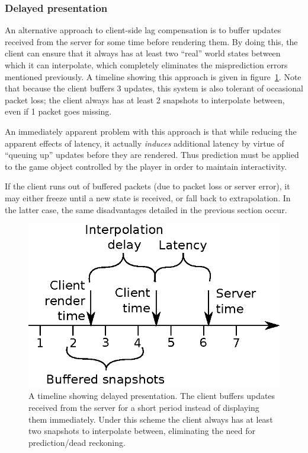 \documentclass[conference]{IEEEtran}
\begin{document}
	\subsubsection{Delayed presentation}

	An alternative approach to client-side lag compensation is to buffer updates received from the server for some time before rendering them. By doing this, the client can ensure that it always has at least two ``real'' world states between which it can interpolate, which completely eliminates the misprediction errors mentioned previously. A timeline showing this approach is given in figure~\ref{fig:interpolation_timeline}. Note that because the client buffers 3 updates, this system is also tolerant of occasional packet loss; the client always has at least 2 snapshots to interpolate between, even if 1 packet goes missing.

	An immediately apparent problem with this approach is that while reducing the apparent effects of latency, it actually \emph{induces} additional latency by virtue of ``queuing up'' updates before they are rendered. Thus prediction must be applied to the game object controlled by the player in order to maintain interactivity.

	If the client runs out of buffered packets (due to packet loss or server error), it may either freeze until a new state is received, or fall back to extrapolation. In the latter case, the same disadvantages detailed in the previous section occur.

	\begin{figure}
		\centering\includegraphics[width=\linewidth]{figures/interpolation_timeline.eps}
		\caption{A timeline showing delayed presentation. The client buffers updates received from the server for a short period instead of displaying them immediately. Under this scheme the client always has at least two snapshots to interpolate between, eliminating the need for prediction/dead reckoning.}
		\label{fig:interpolation_timeline}
	\end{figure}
\end{document}
